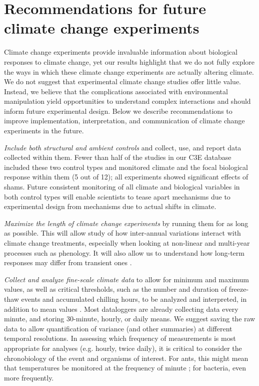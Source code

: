 \documentclass{article}
\begin{document}
\section*{Recommendations for future climate change experiments}
 \par Climate change experiments provide invaluable information about biological responses to climate change, yet our results highlight that we do not fully explore the ways in which these climate change experiments are actually altering climate. We do not suggest that experimental climate change studies offer little value. Instead, we believe that the complications associated with environmental manipulation yield opportunities to understand complex interactions and should inform future experimental design. Below we describe recommendations to improve implementation, interpretation, and communication of climate change experiments in the future.
\par\textit{Include both structural and ambient controls} and collect, use, and report data collected within them. Fewer than half of the studies in our C3E database included these two control types and monitored climate and the focal biological response within them (5 out of 12); all experiments showed significant effects of shams. Future consistent monitoring of all climate and biological variables in both control types will enable scientists to tease apart mechanisms due to experimental design from mechanisms due to actual shifts in climate.  
\par\textit{Maximize the length of climate change experiments} by running them for as long as possible. This will allow study of how inter-annual variations interact with climate change treatments, especially when looking at non-linear and multi-year processes such as phenology. It will also allow us to understand how long-term responses may differ from  transient ones \citep{franklin1989,giasson2013}. %
\par\textit{Collect and analyze fine-scale climate data} to allow for minimum and maximum values, as well as critical thresholds, such as the number and duration of freeze-thaw events and accumulated chilling hours, to be analyzed and interpreted, in addition to mean values \citep{mcdaniel2014}. Most dataloggers are already collecting data every minute, and storing 30-minute, hourly, or daily means. We suggest saving the raw data to allow quantification of variance (and other summaries) at different temporal resolutions. In assessing which frequency of measurements is most appropriate for analyses (e.g. hourly, twice daily), it is critical to consider the chronobiology of the event and organisms of interest. For ants, this might mean that temperatures be monitored at the frequency of minute \citep{shavit2017}; for bacteria, even more frequently.
\end{document}
